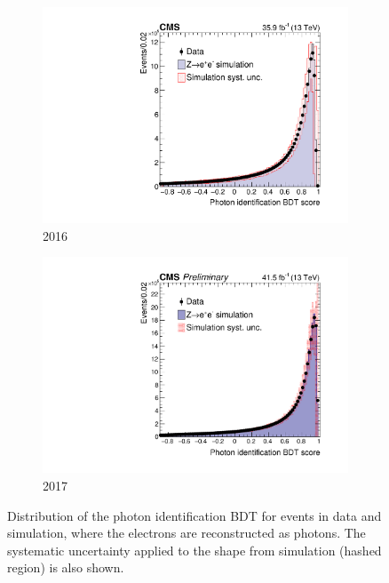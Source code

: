 \begin{figure}[h!]
  \centering
  \begin{subfigure}{0.49\textwidth}
    \includegraphics[width=\textwidth]{Figures/Objects/IDMVAZee_2016}
    \caption{2016}
    \label{fig:obj_IDMVAZee_2016}
  \end{subfigure}
  \begin{subfigure}{0.49\textwidth}
    \includegraphics[width=\textwidth]{Figures/Objects/IDMVAZee_2017}
    \caption{2017}
    \label{fig:obj_IDMVAZee_2016}
  \end{subfigure}
  \caption{Distribution of the photon identification BDT
  for \Zee events in data and simulation, where the electrons are reconstructed as
  photons. The systematic uncertainty applied to the shape from simulation (hashed region) is
  also shown.}
  \label{fig:obj_IDMVAZee}
\end{figure}

